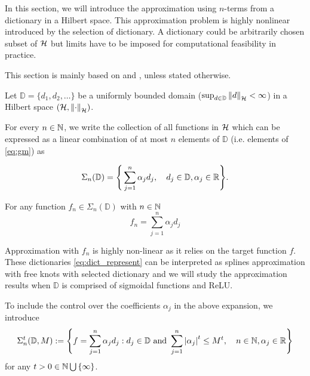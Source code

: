 


In this section, we will introduce the approximation using $n$-terms from a
dictionary in a Hilbert space. This approximation problem is highly nonlinear
introduced by the selection of dictionary. A dictionary could be arbitrarily
chosen subset of $\mathcal{H}$ but limits have to be imposed for computational
feasibility in practice. 

This section is mainly based on \cite[Chapter 8]{devore_1998} and
\cite{vandervaartWeakConvergenceEmpirical1996}, unless stated otherwise.

Let $\mathbb{D} = \{d_1,d_2,\dots\}$ be a uniformly
bounded domain ($\sup_{d\in \mathbb{D}} \left\| d \right\|_{\mathcal{H}} < \infty$) in a
Hilbert space $(\mathcal{H}, \left\| \cdot \right\|_{\mathcal{H}})$. 

For every $n \in \mathbb{N}$, we write the collection of all functions in $\mathcal{H}$
which can be expressed as a linear combination of at most $n$ elements of
$\mathbb{D}$ (i.e. elements of \eqref{eq:gm}) as

\begin{equation}
    \label{eq:dict_represent}
    \Sigma_n(\mathbb{D}) = \Bigg\{
        \sum_{j=1}^n \alpha_j d_j, \quad
        d_j \in \mathbb{D}, \alpha_j \in \mathbb{R}
    \Bigg\}.
\end{equation}

For any function $f_n \in \Sigma_n(\mathbb{D})$ with $n \in \mathbb{N}$
\begin{equation}
    \label{eq:gm}
    f_n = \sum_{j=1}^n \alpha_j d_j
\end{equation}

Approximation with $f_n$ is highly non-linear as it relies on the target
function $f$. These dictionaries \eqref{eq:dict_represent} can be interpreted as
splines approximation with free knots with selected dictionary and we will study
the approximation results when $\mathbb{D}$ is comprised of sigmoidal functions
and ReLU.

To include the control over the coefficients $\alpha_j$ in the above expansion,
we introduce
\begin{equation}
    \label{eq:dict_sigma}
    \Sigma^{t}_n(\mathbb{D}, M) := \Bigg\{
        f = \sum_{j=1}^n \alpha_j d_j: 
        d_j \in \mathbb{D} \textnormal{ and } 
        \sum_{j=1}^n \left| \alpha_j \right|^t \leq M^t, \quad 
        n \in \mathbb{N}, \alpha_j \in \mathbb{R}
    \Bigg\}
\end{equation}
for any $t > 0 \in \mathbb{N} \bigcup\, \{\infty\}$. 

